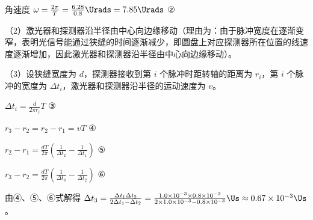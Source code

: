 \documentclass[\gkver]{gaokaozhenti}
\begin{document}
\begin{enumerate}
{角速度 $\omega=\frac{2\pi}{T}=\frac{6.28}{0.8}\Urads=7.85\Urads$ ②

（2）激光器和探测器沿半径由中心向边缘移动（理由为：由于脉冲宽度在逐渐变窄，表明光信号能通过狭缝的时间逐渐减少，即圆盘上对应探测器所在位置的线速度逐渐增加，因此激光器和探测器沿半径由中心向边缘移动）。

（3）设狭缝宽度为 $d$，探测器接收到第 $i$ 个脉冲时距转轴的距离为 $r_{i}$，第 $i$ 个脉冲的宽度为 $\Delta t_{i}$，激光器和探测器沿半径的运动速度为 $v$。

$\Delta t_{i}=\frac{d}{2\pi r_{i}}T$ ③

$r_{3}-r_{2}=r_{2}-r_{1}=vT$ ④

$r_{2}-r_{1}=\frac{dT}{2\pi}\left(\frac{1}{\Delta t_{2}}-\frac{1}{\Delta t_{1}}\right)$ ⑤

$r_{3}-r_{2}=\frac{dT}{2\pi}\left(\frac{1}{\Delta t_{3}}-\frac{1}{\Delta t_{2}}\right)$ ⑥

由④、⑤、⑥式解得 $\Delta t_{3}=\frac{\Delta t_{1}\Delta t_{2}}{2\Delta t_{1}-\Delta t_{2}}=\frac{1.0\times10^{-3}\times0.8\times10^{-3}}{2\times1.0\times10^{-3}-0.8\times10^{-3}}\Us\approx0.67\times10^{-3}\Us$。
}

\end{enumerate}
\end{document}
